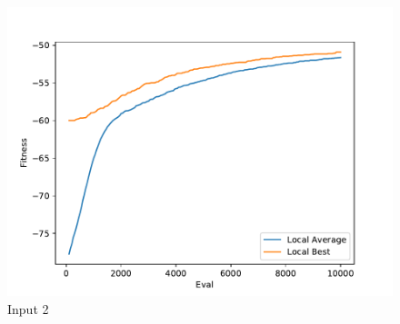\documentclass{standalone}
\begin{document}
\begin{figure}[!htb]
	\caption{Input 2}
	\label{fig:graph_2012}
	\includegraphics[width=\textwidth]{../graphs/graphs/2012.pdf}
\end{figure}
\end{document}
